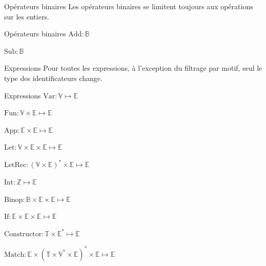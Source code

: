 \documentclass{beamer}
\begin{document}
\begin{frame}{Opérateurs binaires}
    Les opérateurs binaires se limitent toujours aux opérations sur les entiers.

    \begin{block}{Opérateurs binaires}
        $\text{Add} : \mathbb{B}$%

        $\text{Sub} : \mathbb{B}$%
    \end{block}
\end{frame}

\begin{frame}{Expressions}
    Pour toutes les expressions, à l'exception du filtrage par motif, seul le type des identificateurs change.%
    
    \begin{block}{Expressions}
        $\text{Var} : \mathbb{V} \mapsto \mathbb{E}$%

        $\text{Fun} : \mathbb{V} \times \mathbb{E} \mapsto \mathbb{E}$%

        $\text{App} : \mathbb{E} \times \mathbb{E} \mapsto \mathbb{E}$%

        $\text{Let} : \mathbb{V} \times \mathbb{E} \times \mathbb{E} \mapsto \mathbb{E}$%

        $\text{LetRec} : (\mathbb{V} \times \mathbb{E})^{*} \times \mathbb{E} \mapsto \mathbb{E}$%

        $\text{Int} : \mathbb{Z} \mapsto \mathbb{E}$%

        $\text{Binop} : \mathbb{B} \times \mathbb{E} \times \mathbb{E} \mapsto \mathbb{E}$%

        $\text{If} : \mathbb{E} \times \mathbb{E} \times \mathbb{E} \mapsto \mathbb{E}$%

        $\text{Constructor} : \mathbb{T} \times \mathbb{E}^{*} \mapsto \mathbb{E}$%

        $\text{Match} : \mathbb{E} \times (\mathbb{T} \times \mathbb{V}^{*} \times \mathbb{E})^{*} \times \mathbb{E} \mapsto \mathbb{E}$%
    \end{block}
\end{frame}
\end{document}
